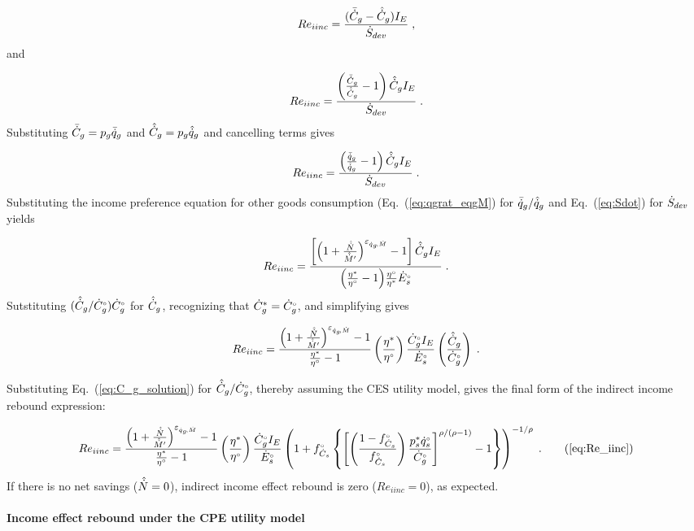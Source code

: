\begin{equation}
  Re_{iinc} = \frac{(\bar{\dot{C}}_g - \hat{\dot{C}}_g) I_E}{\dot{S}_{dev}} \; ,
\end{equation}
%
and

\begin{equation}
  Re_{iinc} = \frac{\left( \frac{\bar{\dot{C}}_g}{\hat{\dot{C}}_g} - 1  \right) \hat{\dot{C}}_g I_E}{\dot{S}_{dev}} \; .
\end{equation}
%
Substituting $\bar{\dot{C}}_g = p_g \bar{\dot{q}}_g$ and $\hat{\dot{C}}_g = p_g \hat{\dot{q}}_g$ and
cancelling terms gives

\begin{equation}
  Re_{iinc} = \frac{\left( \frac{\bar{\dot{q}}_g}{\hat{\dot{q}}_g} - 1  \right) \hat{\dot{C}}_g I_E}{\dot{S}_{dev}} \; .
\end{equation}
%
Substituting the income preference equation for other goods consumption (Eq.~(\ref{eq:qgrat_eqgM})
for $\bar{\dot{q}}_g / \hat{\dot{q}}_g$
and Eq.~(\ref{eq:Sdot}) for $\dot{S}_{dev}$ yields

\begin{equation}
  Re_{iinc} = \frac{\left[ \left( 1 + \frac{\hat{\dot{N}}}{\hat{\dot{M}}^\prime} \right)^{\varepsilon_{\dot{q}_g\!,\dot{M}}} - 1  \right]
              \hat{\dot{C}}_g I_E}{\left( \frac{{\eta}^*}{{}{\eta}^{\scriptscriptstyle \circ}} - 1 \right)\! \frac{{}{\eta}^{\scriptscriptstyle \circ}}{{\eta}^*} {}{\dot{E}}^{\scriptscriptstyle \circ}_s} \; .
\end{equation}
%
Sutstituting $(\hat{\dot{C}}_g/{}{\dot{C}}^{\scriptscriptstyle \circ}_g) {}{\dot{C}}^{\scriptscriptstyle \circ}_g$ for $\hat{\dot{C}}_g$,
recognizing that ${\dot{C}}^*_g = {}{\dot{C}}^{\scriptscriptstyle \circ}_g$, and simplifying gives

\begin{equation}
  Re_{iinc} = \frac{\left( 1 + \frac{\hat{\dot{N}}}{\hat{\dot{M}}^\prime} \right)^{\varepsilon_{\dot{q}_g\!,\dot{M}}} - 1}{\frac{{\eta}^*}{{}{\eta}^{\scriptscriptstyle \circ}} - 1}
              \left( \frac{{\eta}^*}{{}{\eta}^{\scriptscriptstyle \circ}} \right)
              \frac{{}{\dot{C}}^{\scriptscriptstyle \circ}_g I_E}{{}{\dot{E}}^{\scriptscriptstyle \circ}_s}
              \left( \frac{\hat{\dot{C}}_g}{{}{\dot{C}}^{\scriptscriptstyle \circ}_g} \right) \; .
\end{equation}

Substituting Eq.~(\ref{eq:C_g_solution})
for $\hat{\dot{C}}_g / {}{\dot{C}}^{\scriptscriptstyle \circ}_g$,
thereby assuming the CES utility model,
gives the final form
of the indirect income rebound expression:

\begin{equation}
  Re_{iinc} = \Reiinceqnexact{} \; . \tag{\ref{eq:Re_iinc}}
\end{equation}
%
If there is no net savings ($\hat{\dot{N}} = 0$),
indirect income effect rebound is zero ($Re_{iinc} = 0$), as expected.


\paragraph{Income effect rebound under the CPE utility model}
\label{sec:income_effect_CPE}

